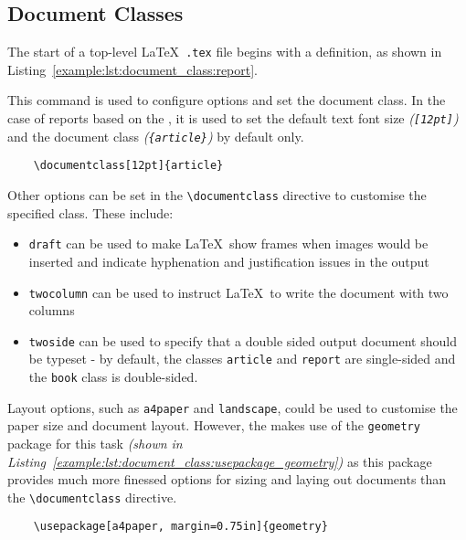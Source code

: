 \subsection{Document Classes}
The start of a top-level \LaTeX\ \texttt{.tex} file begins with a  definition, as shown in Listing~\ref{example:lst:document_class:report}.

This command is used to configure options and set the document class. In the case of reports based on the \uswdwmspkg{}, it is used to set the default text font size \textit{(\texttt{[12pt]})} and the document class \textit{(\texttt{\{article\}})} by default only.

\begin{listing}[H]
  \captionsetup{skip=\skiplistingcaptionlen}
  \begin{verbatim}
    \documentclass[12pt]{article}
  \end{verbatim}
  \caption{\texttt{\textbackslash documentclass} command example}
  \label{example:lst:document_class:report}
\end{listing}

Other options can be set in the \texttt{\textbackslash documentclass} directive to customise the specified class. These include:

\begin{itemize}
  \item \texttt{draft} can be used to make \LaTeX\ show frames when images would be inserted and indicate hyphenation and justification issues in the output
  \item \texttt{twocolumn} can be used to instruct \LaTeX\ to write the document with two columns
  \item \texttt{twoside} can be used to specify that a double sided output document should be typeset - by default, the classes \texttt{article} and \texttt{report} are single-sided and the \texttt{book} class is double-sided.
\end{itemize}

Layout options, such as \texttt{a4paper} and \texttt{landscape}, could be used to customise the paper size and document layout. However, the \uswdwmspkg{} makes use of the \texttt{geometry} package for this task \textit{(shown in Listing~\ref{example:lst:document_class:usepackage_geometry})} as this package provides much more finessed options for sizing and laying out documents than the \texttt{\textbackslash documentclass} directive.

\begin{listing}[H]
  \captionsetup{skip=\skiplistingcaptionlen}
  \begin{verbatim}
    \usepackage[a4paper, margin=0.75in]{geometry}
  \end{verbatim}
  \caption{\texttt{geometry} package import and configuration example}
  \label{example:lst:document_class:usepackage_geometry}
\end{listing}

